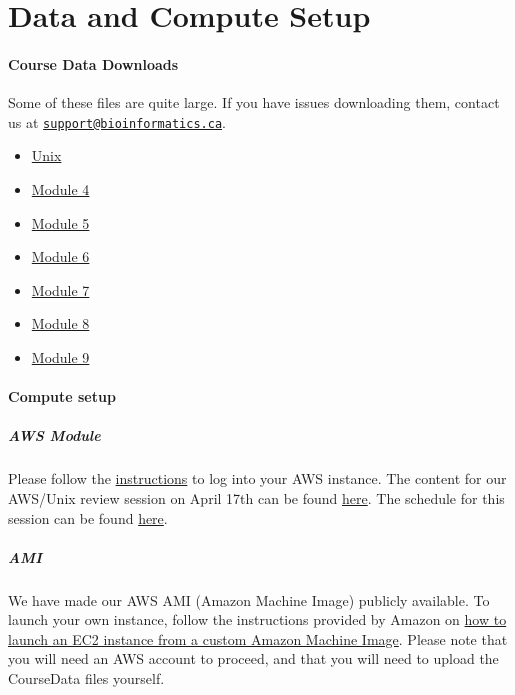 \documentclass[
]{book}
\providecommand{\tightlist}{%
  \setlength{\itemsep}{0pt}\setlength{\parskip}{0pt}}
\begin{document}
\chapter{Data and Compute Setup}\label{data-and-compute-setup}

\subsubsection{Course Data Downloads}\label{course-data-downloads}

Some of these files are quite large. If you have issues downloading them, contact us at \href{mailto:support@bioinformatics.ca}{\nolinkurl{support@bioinformatics.ca}}.

\begin{itemize}
\tightlist
\item
  \href{}{Unix}
\item
  \href{}{Module 4}
\item
  \href{}{Module 5}
\item
  \href{}{Module 6}
\item
  \href{}{Module 7}
\item
  \href{}{Module 8}
\item
  \href{}{Module 9}
\end{itemize}

\subsubsection{Compute setup}\label{compute-setup}

\paragraph{AWS Module}\label{aws-module}

Please follow the \href{https://bioinformaticsdotca.github.io/AWS_setup}{instructions} to log into your AWS instance.
The content for our AWS/Unix review session on April 17th can be found \href{https://bioinformaticsdotca.github.io/AWS_IDE23}{here}.
The schedule for this session can be found \href{https://bioinformaticsdotca.github.io/AWS_IDE23_Schedule}{here}.

\paragraph{AMI}\label{ami}

We have made our AWS AMI (Amazon Machine Image) publicly available. To launch your own instance, follow the instructions provided by Amazon on \href{https://repost.aws/knowledge-center/launch-instance-custom-ami}{how to launch an EC2 instance from a custom Amazon Machine Image}. Please note that you will need an AWS account to proceed, and that you will need to upload the CourseData files yourself.
\end{document}
